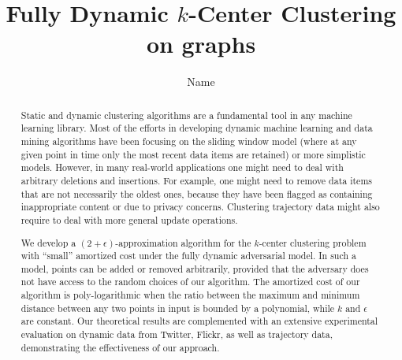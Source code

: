 \documentclass[sigconf]{acmart}
\theoremstyle{definition}
\newcounter{note}[section]
\begin{document}
\title{Fully Dynamic $k$-Center Clustering on graphs}

\author{Name}


\begin{abstract}
	Static and dynamic clustering algorithms are a fundamental tool in any
	machine learning library. Most of the efforts in developing dynamic machine
	learning and data mining algorithms have been focusing on the sliding
	window model (where at any given point in time only the most recent data
	items are retained) or more simplistic models. However, in many real-world
	applications one might need to deal with arbitrary deletions and
	insertions. For example, one might need to remove data items that are not
	necessarily the oldest ones, because they have been flagged as containing
	inappropriate content or due to privacy concerns. Clustering trajectory
	data might also require to deal with more general update operations.

	We develop a $(2+\epsilon)$-approximation algorithm for the $k$-center
	clustering problem with ``small'' amortized cost under the fully dynamic
	adversarial model. In such a model, points can be added or removed
	arbitrarily, provided that the adversary does not have access to the random
	choices of our algorithm.  The amortized cost of our algorithm is
	poly-logarithmic when the ratio between the maximum and minimum distance
	between any two points in input is bounded by a polynomial, while $k$ and
	$\epsilon$ are constant. Our theoretical results are complemented with an
	extensive experimental evaluation on dynamic data from Twitter, Flickr, as
	well as trajectory data, demonstrating the effectiveness of our approach.
\end{abstract}


\maketitle

%

%
%
%
%
%



\end{document}
